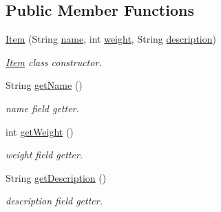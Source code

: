 \subsection*{Public Member Functions}
\begin{DoxyCompactItemize}
\item 
\hyperlink{classpkg__world_1_1pkg__items_1_1Item_a7ece2bd85f9e388cb9c2813f0b5ecc4e}{Item} (String \hyperlink{classpkg__world_1_1pkg__items_1_1Item_ad4d60e860c8a6eb753f24a84cda24c60}{name}, int \hyperlink{classpkg__world_1_1pkg__items_1_1Item_a3550e4e4d450da85707ad86b33e88667}{weight}, String \hyperlink{classpkg__world_1_1pkg__items_1_1Item_a8c9a4a4ced5e41295c411fcdd1f3ec72}{description})
\begin{DoxyCompactList}\small\item\em \hyperlink{classpkg__world_1_1pkg__items_1_1Item}{Item} class constructor. \end{DoxyCompactList}\item 
String \hyperlink{classpkg__world_1_1pkg__items_1_1Item_ab541df9aad01409656af1aadfa66987a}{get\-Name} ()
\begin{DoxyCompactList}\small\item\em name field getter. \end{DoxyCompactList}\item 
int \hyperlink{classpkg__world_1_1pkg__items_1_1Item_afd46034ba99392bbe4a4432150c870d4}{get\-Weight} ()
\begin{DoxyCompactList}\small\item\em weight field getter. \end{DoxyCompactList}\item 
String \hyperlink{classpkg__world_1_1pkg__items_1_1Item_ac2f68a92afd7e089cc4b955c37a63417}{get\-Description} ()
\begin{DoxyCompactList}\small\item\em description field getter. \end{DoxyCompactList}\end{DoxyCompactItemize}
